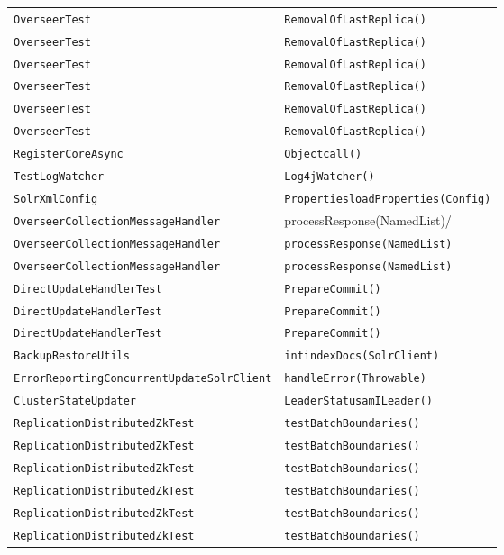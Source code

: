 \begin{center}
\begin{longtable}{ll}
\lstinline/OverseerTest/&{\lstinline/RemovalOfLastReplica()/}\\
\lstinline/OverseerTest/&{\lstinline/RemovalOfLastReplica()/}\\
\lstinline/OverseerTest/&{\lstinline/RemovalOfLastReplica()/}\\
\lstinline/OverseerTest/&{\lstinline/RemovalOfLastReplica()/}\\
\lstinline/OverseerTest/&{\lstinline/RemovalOfLastReplica()/}\\
\lstinline/OverseerTest/&{\lstinline/RemovalOfLastReplica()/}\\
\lstinline/RegisterCoreAsync/&{\lstinline/Objectcall()/}\\
\lstinline/TestLogWatcher/&{\lstinline/Log4jWatcher()/}\\
\lstinline/SolrXmlConfig/&{\lstinline/PropertiesloadProperties(Config)/}\\
\lstinline/OverseerCollectionMessageHandler/&{processResponse(NamedList)/}\\
\lstinline/OverseerCollectionMessageHandler/&{\lstinline/processResponse(NamedList)/}\\
\lstinline/OverseerCollectionMessageHandler/&{\lstinline/processResponse(NamedList)/}\\
\lstinline/DirectUpdateHandlerTest/&{\lstinline/PrepareCommit()/}\\
\lstinline/DirectUpdateHandlerTest/&{\lstinline/PrepareCommit()/}\\
\lstinline/DirectUpdateHandlerTest/&{\lstinline/PrepareCommit()/}\\
\lstinline/BackupRestoreUtils/&{\lstinline/intindexDocs(SolrClient)/}\\
\lstinline/ErrorReportingConcurrentUpdateSolrClient/&{\lstinline/handleError(Throwable)/}\\
\lstinline/ClusterStateUpdater/&{\lstinline/LeaderStatusamILeader()/}\\
\lstinline/ReplicationDistributedZkTest/&{\lstinline/testBatchBoundaries()/}\\
\lstinline/ReplicationDistributedZkTest/&{\lstinline/testBatchBoundaries()/}\\
\lstinline/ReplicationDistributedZkTest/&{\lstinline/testBatchBoundaries()/}\\
\lstinline/ReplicationDistributedZkTest/&{\lstinline/testBatchBoundaries()/}\\
\lstinline/ReplicationDistributedZkTest/&{\lstinline/testBatchBoundaries()/}\\
\lstinline/ReplicationDistributedZkTest/&{\lstinline/testBatchBoundaries()/}\\

\end{longtable}
\end{center}
